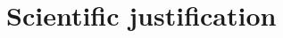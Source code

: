 \documentclass[12pt,a4paper]{article}  %
\begin{document}
\pagestyle{plain}
 



\section{Scientific justification}

%
%
 

%
\end{document}
